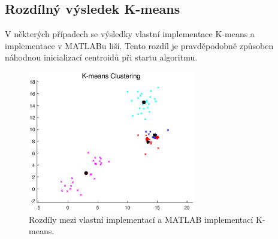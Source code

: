 \subsection{Rozdílný výsledek K-means}
V některých případech se výsledky vlastní implementace K-means a implementace v MATLABu liší. Tento rozdíl je pravděpodobně způsoben náhodnou inicializací centroidů při startu algoritmu.

\begin{figure}[H]
    \centering
    \includegraphics[width=0.65\textwidth]{images/kmeans_difference.eps}
    \caption{Rozdíly mezi vlastní implementací a MATLAB implementací K-means.}
\end{figure}
